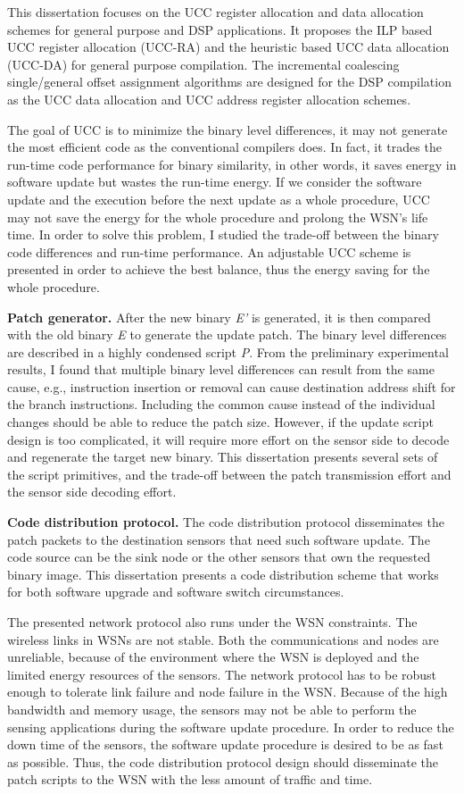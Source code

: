 This dissertation focuses on the UCC register allocation and data allocation schemes for general purpose and DSP applications.
It proposes the ILP based UCC register allocation (UCC-RA) and the heuristic based UCC data allocation (UCC-DA) for general purpose compilation.
The incremental coalescing single/general offset assignment algorithms are designed for the DSP compilation as the UCC data allocation and UCC address register allocation schemes.

The goal of UCC is to minimize the binary level differences, it may not generate the most efficient code as the conventional compilers does.
In fact, it trades the run-time code performance for binary similarity, in other words, it saves energy in software update but wastes the run-time energy.
If we consider the software update and the execution before the next update as a whole procedure, UCC may not save the energy for the whole procedure and prolong the WSN's life time.
In order to solve this problem, I studied the trade-off between the binary code differences and run-time performance. An adjustable UCC scheme is presented in order to achieve the best balance, thus the energy saving for the whole procedure.
	
\textbf{Patch generator.}
After the new binary {\it E'} is generated, it is then compared with the old binary {\it E} to generate the update patch. The binary level differences are described in a highly condensed script {\it P}. 
From the preliminary experimental results, I found that multiple binary level differences can result from the same cause, e.g., instruction insertion or removal can cause destination address shift for the branch instructions.
Including the common cause instead of the individual changes should be able to reduce the patch size.
However, if the update script design is too complicated, it will require more effort on the sensor side to decode and regenerate the target new binary.
This dissertation presents several sets of the script primitives, and the trade-off between the patch transmission effort and the sensor side decoding effort.


\textbf{Code distribution protocol.}
The code distribution protocol disseminates the patch packets to the destination sensors that need such software update. The code source can be the sink node or the other sensors that own the requested binary image.
This dissertation presents 
a code distribution scheme that works for both software upgrade and software switch circumstances.

The presented network protocol also runs under the WSN constraints.
The wireless links in WSNs are not stable. Both the communications and nodes are unreliable, because of the environment where the WSN is deployed and the limited energy resources of the sensors. The network protocol has to be robust enough to tolerate link failure and node failure in the WSN.
Because of the high bandwidth and memory usage, the sensors may not be able to perform the sensing applications during the software update procedure. In order to reduce the down time of the sensors, the software update procedure is desired to be as fast as possible. 
Thus, the code distribution protocol design should disseminate the patch scripts to the WSN with the less amount of traffic and time.

